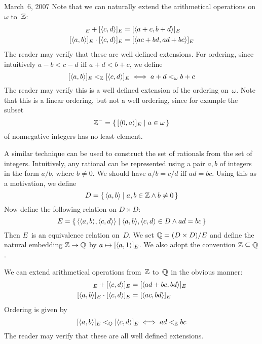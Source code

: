 \begin{lecture}{March~6, 2007}
Note that we can naturally extend the arithmetical operations on~\(\omega\) to~\(\mathbb{Z}\):
\begin{align*}
[\pair{a}{b}]_E+[\pair{c}{d}]_E&=[\pair{a+c}{b+d}]_E\\
[\pair{a}{b}]_E\cdot[\pair{c}{d}]_E&=[\pair{ac+bd}{ad+bc}]_E
\end{align*}
The reader may verify that these are well defined extensions. For ordering, since intuitively \(a-b<c-d\) iff \(a+d<b+c\), we define
\[[\langle{a},{b}\rangle]_E<_{\mathbb{Z}}[\langle{c},{d}\rangle]_E\iff a+d<_{\omega}b+c\]
The reader may verify this is a well defined extension of the ordering on~\(\omega\). Note that this is a linear ordering, but not a well ordering, since for example the subset
\[\mathbb{Z}^-=\{\,[\langle{0},{a}\rangle]_E\mid a\in\omega\,\}\]
of nonnegative integers has no least element.

A similar technique can be used to construct the set of rationals from the set of integers. Intuitively, any rational can be represented using a pair \(a,b\) of integers in the form \(a/b\), where \(b\ne 0\). We should have \(a/b=c/d\) iff \(ad=bc\). Using this as a motivation, we define
\[D=\{\,\langle{a},{b}\rangle\mid a,b\in\mathbb{Z}\land b\ne0\,\}\]
Now define the following relation on \(D\times D\):
\[E=\{\,\langle{\langle{a},{b}\rangle},{\langle{c},{d}\rangle}\rangle\mid \langle{a},{b}\rangle,\langle{c},{d}\rangle\in D\land ad=bc\,\}\]
Then \(E\)~is an equivalence relation on~\(D\). We set \(\mathbb{Q}=(D\times D)/E\) and define the natural embedding \(\mathbb{Z}\to\mathbb{Q}\) by \(a\mapsto[\langle{a},{1}\rangle]_E\). We also adopt the convention \(\mathbb{Z}\subseteq\mathbb{Q}\).

We can extend arithmetical operations from~\(\mathbb{Z}\) to~\(\mathbb{Q}\) in the obvious manner:
\begin{align*}
[\pair{a}{b}]_E+[\pair{c}{d}]_E&=[\pair{ad+bc}{bd}]_E\\
[\pair{a}{b}]_E\cdot[\pair{c}{d}]_E&=[\pair{ac}{bd}]_E
\end{align*}
Ordering is given by
\[[\langle{a},{b}\rangle]_E<_{\mathbb{Q}}[\langle{c},{d}\rangle]_E\iff ad<_{\mathbb{Z}}bc\]
The reader may verify that these are all well defined extensions.


\end{lecture}
